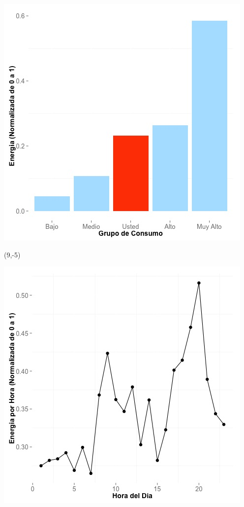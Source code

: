 \documentclass{article}\usepackage[]{graphicx}\usepackage[]{color}
\newenvironment{knitrout}{}{} %
\begin{document}
\begin{knitrout}
\color{fgcolor}
\includegraphics[scale=0.65]{figure/A3_neighbor_plot} 
\end{knitrout}

 \begin{textblock}{1}(9,-5)
\begin{minipage}{20em}
\begingroup

\endgroup
\end{minipage}
\end{textblock}


\begin{knitrout}
\color{fgcolor}
\includegraphics[scale=0.65]{figure/A3_plot_norm_median} 
\end{knitrout}
\end{document}
